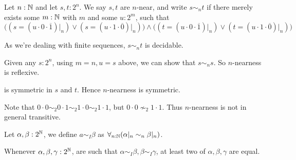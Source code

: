 \begin{definition}
  Let $n:\mathbb{N}$ and let $s,t : 2^n$. 
  We say $s,t$ are $n$-near, and write $s\sim_n t$ if 
  there merely exists some $m:\mathbb{N}$ with $m$ and some $u:2^m$, such that 
 \begin{equation}\label{EqnNearness}
   \big(
     (s = (u\cdot 0\cdot \overline 1)|_n) \vee (s = (u \cdot 1 \cdot \overline 0) |_n)
   \big)
    \wedge 
   \big(
     (t = (u\cdot 0\cdot \overline 1)|_n) \vee (t = (u \cdot 1 \cdot \overline 0) |_n)
   \big)
  \end{equation} 
\end{definition}
\begin{remark}\label{nearnessProperties}
\item As we're dealing with finite sequences, $s\sim_n t$ is decidable. 
\item Given any $s:2^n$, using $m=n, u = s$ above, we can show that $s\sim_n s$. 
  So $n$-nearness is reflexive. 
\item {} is symmetric in $s$ and $t$. Hence $n$-nearness is symmetric.
\item Note that $0\cdot 0\sim_2 0\cdot 1 \sim_2 1\cdot 0 \sim_2 1\cdot 1$, 
  but $0\cdot 0\nsim_2 1\cdot 1$. %
  Thus $n$-nearness is not in general transitive. 
\end{remark}
\begin{definition}
  Let $\alpha, \beta: 2^{\mathbb{N}}$, we define $a\sim_I\beta$ as 
  $\forall_{n:\mathbb{N}} (\alpha|_n \sim_n \beta|_n)$. 
\end{definition}
\begin{lemma}\label{IntervalFiberSizeAtMost2}
  Whenever $\alpha,\beta,\gamma:2^{\mathbb{N}}$, are such that 
  $\alpha\sim_I \beta, \beta\sim_I \gamma$, 
  at least two of $\alpha,\beta,\gamma$ are equal. 
\end{lemma}
